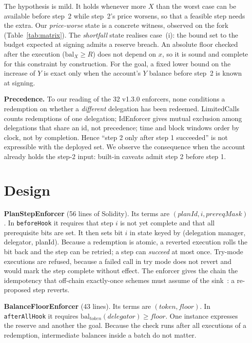 \documentclass[conference]{IEEEtran}
\begin{document}
The hypothesis is mild. It holds whenever more $X$ than the worst case can be available before step~2 while step~2's
price worsens, so that a feasible step needs the extra. Our \emph{price-worse} state is a concrete witness, observed on
the fork (Table~\ref{tab:matrix}). The \emph{shortfall} state realises case~(i): the bound set to the budget expected
at signing admits a reserve breach. An absolute floor checked after the execution ($\mathrm{bal}_X \ge R$) does not
depend on $x$, so it is sound and complete for this constraint by construction. For the goal, a fixed lower bound on the
increase of $Y$ is exact only when the account's $Y$ balance before step~2 is known at signing.

\textbf{Precedence.} To our reading of the 32 v1.3.0 enforcers, none conditions a redemption on whether a
\emph{different} delegation has been redeemed. LimitedCalls counts redemptions of one delegation; IdEnforcer gives
mutual exclusion among delegations that share an id, not precedence; time and block windows order by clock, not by
completion. Hence ``step 2 only after step 1 succeeded'' is not expressible with the deployed set. We observe the
consequence when the account already holds the step-2 input: built-in caveats admit step 2 before step 1.

\section{Design}\label{sec:design}

\textbf{PlanStepEnforcer} (56 lines of Solidity). Its terms are $(\mathit{planId}, i, \mathit{prereqMask})$. In
\texttt{beforeHook} it requires that step $i$ is not yet complete and that all prerequisite bits are set. It then sets bit $i$
in state keyed by (delegation manager, delegator, planId). Because a redemption is atomic, a reverted execution rolls
the bit back and the step can be retried; a step can \emph{succeed} at most once. Try-mode executions are refused,
because a failed call in try mode does not revert and would mark the step complete without effect. The enforcer gives
the chain the idempotency that off-chain exactly-once schemes must assume of the sink~\cite{caplease2026,aidguard2026}: a
re-proposed step reverts.

\textbf{BalanceFloorEnforcer} (43 lines). Its terms are $(\mathit{token}, \mathit{floor})$. In
\texttt{afterAllHook} it requires $\mathrm{bal}_{\mathit{token}}(\mathit{delegator}) \ge \mathit{floor}$. One instance
expresses the reserve and another the goal. Because the check runs after all executions of a redemption,
intermediate balances inside a batch do not matter.
\end{document}
